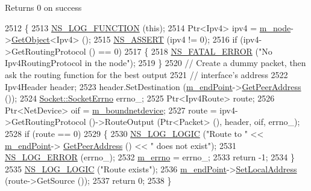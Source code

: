 \begin{DoxyReturn}{Returns}
0 on success 
\end{DoxyReturn}

\begin{DoxyCode}
2512 \{
2513   \hyperlink{log-macros-disabled_8h_a90b90d5bad1f39cb1b64923ea94c0761}{NS\_LOG\_FUNCTION} (\textcolor{keyword}{this});
2514   Ptr<Ipv4> ipv4 = \hyperlink{classns3_1_1TcpSocketBase_abefd2b9f439fe5d0deef93ee68884a1e}{m\_node}->\hyperlink{classns3_1_1Object_a13e18c00017096c8381eb651d5bd0783}{GetObject}<Ipv4> ();
2515   \hyperlink{assert_8h_a6dccdb0de9b252f60088ce281c49d052}{NS\_ASSERT} (ipv4 != 0);
2516   \textcolor{keywordflow}{if} (ipv4->GetRoutingProtocol () == 0)
2517     \{
2518       \hyperlink{group__fatal_ga5131d5e3f75d7d4cbfd706ac456fdc85}{NS\_FATAL\_ERROR} (\textcolor{stringliteral}{"No Ipv4RoutingProtocol in the node"});
2519     \}
2520   \textcolor{comment}{// Create a dummy packet, then ask the routing function for the best output}
2521   \textcolor{comment}{// interface's address}
2522   Ipv4Header header;
2523   header.SetDestination (\hyperlink{classns3_1_1TcpSocketBase_a78a4181c0a7394749110ea6b194de467}{m\_endPoint}->\hyperlink{classns3_1_1Ipv4EndPoint_a3faf5ec4dce2e951a6ade79758e2075d}{GetPeerAddress} ());
2524   \hyperlink{classns3_1_1Socket_ada1328c5ae0c28cb2a982caf8f6d6cca}{Socket::SocketErrno} errno\_;
2525   Ptr<Ipv4Route> route;
2526   Ptr<NetDevice> oif = \hyperlink{classns3_1_1Socket_a9781d8dfdb5e9364d5dce8f53b768bb5}{m\_boundnetdevice};
2527   route = ipv4->GetRoutingProtocol ()->RouteOutput (Ptr<Packet> (), header, oif, errno\_);
2528   \textcolor{keywordflow}{if} (route == 0)
2529     \{
2530       \hyperlink{group__logging_ga88acd260151caf2db9c0fc84997f45ce}{NS\_LOG\_LOGIC} (\textcolor{stringliteral}{"Route to "} << \hyperlink{classns3_1_1TcpSocketBase_a78a4181c0a7394749110ea6b194de467}{m\_endPoint}->
      \hyperlink{classns3_1_1Ipv4EndPoint_a3faf5ec4dce2e951a6ade79758e2075d}{GetPeerAddress} () << \textcolor{stringliteral}{" does not exist"});
2531       \hyperlink{group__logging_ga0261a8db1d4ac5f79417d117634fd455}{NS\_LOG\_ERROR} (errno\_);
2532       \hyperlink{classns3_1_1TcpSocketBase_a592901b6c992843533af1b7c1c7f9474}{m\_errno} = errno\_;
2533       \textcolor{keywordflow}{return} -1;
2534     \}
2535   \hyperlink{group__logging_ga88acd260151caf2db9c0fc84997f45ce}{NS\_LOG\_LOGIC} (\textcolor{stringliteral}{"Route exists"});
2536   \hyperlink{classns3_1_1TcpSocketBase_a78a4181c0a7394749110ea6b194de467}{m\_endPoint}->\hyperlink{classns3_1_1Ipv4EndPoint_a2b8ad9db8b266a73ee14118025fa5b03}{SetLocalAddress} (route->GetSource ());
2537   \textcolor{keywordflow}{return} 0;
2538 \}
\end{DoxyCode}


